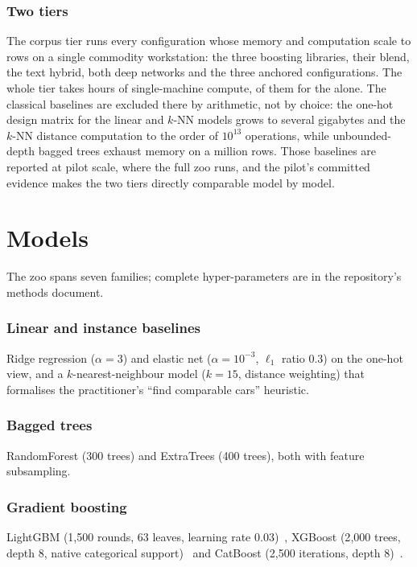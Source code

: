 \documentclass[journal,10pt]{IEEEtran}
\begin{document}
\subsubsection{Two tiers} The corpus tier runs every configuration whose memory and computation scale to \NRows{} rows on a single commodity workstation: the three boosting libraries, their blend, the text hybrid, both deep networks and the three anchored configurations. The whole tier takes \StudyHours{} hours of single-machine compute, \DeepFitHours{} of them for the \SlowestModel{} alone. The classical baselines are excluded there by arithmetic, not by choice: the one-hot design matrix for the linear and $k$-NN models grows to several gigabytes and the $k$-NN distance computation to the order of $10^{13}$ operations, while unbounded-depth bagged trees exhaust memory on a million rows. Those baselines are reported at pilot scale, where the full zoo runs, and the pilot's committed evidence makes the two tiers directly comparable model by model.

\section{Models}
\label{sec:models}
The zoo spans seven families; complete hyper-parameters are in the repository's methods document.

\subsubsection{Linear and instance baselines} Ridge regression ($\alpha=3$) and elastic net ($\alpha=10^{-3}$, $\ell_1$ ratio 0.3) on the one-hot view, and a $k$-nearest-neighbour model ($k=15$, distance weighting) that formalises the practitioner's ``find comparable cars'' heuristic.

\subsubsection{Bagged trees} RandomForest (300 trees) and ExtraTrees (400 trees), both with feature subsampling.

\subsubsection{Gradient boosting} LightGBM (1{,}500 rounds, 63 leaves, learning rate 0.03)~\cite{ke2017}, XGBoost (2{,}000 trees, depth 8, native categorical support)~\cite{chen2016} and CatBoost (2{,}500 iterations, depth 8)~\cite{prokhorenkova2018}.
\end{document}

